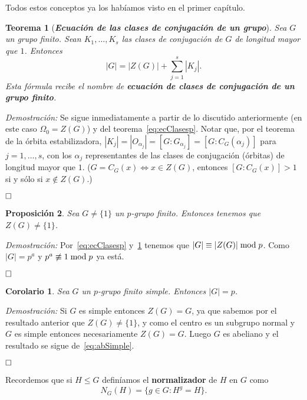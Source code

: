 \documentclass[12pt]{article}
\newtheorem{theorem}{Teorema}[section]
\newtheorem{proposition}[theorem]{Proposición}
\newtheorem{corolario}{Corolario}[theorem]
\begin{document}
Todos estos conceptos ya los habíamos visto en el primer capítulo.

\begin{theorem}[\textit{\textbf{Ecuación de las clases de conjugación de un grupo}}] \label{eq:ecClases}
Sea $G$ un grupo finito. Sean $K_{1}, \ldots, K_{s}$ las clases de conjugación de $G$ de longitud mayor que $1$. Entonces $$|G| = |Z(G)| + \sum_{j=1}^{s} |K_{j}|.$$ Esta fórmula recibe el nombre de \textbf{ecuación de clases de conjugación de un grupo finito}.
\end{theorem} 
\emph{Demostración: } Se sigue inmediatamente a partir de lo discutido anteriormente (en este caso $\Omega_0 = Z(G)$) y del teorema~\ref{eq:ecClasesp}. Notar que, por el teorema de la órbita estabilizadora, $|K_{j}| = |O_{\alpha_{j}}| = [G:G_{\alpha_{j}}] = [G:C_{G}(\alpha_{j})]$ para $j=1, \ldots, s$, con los $\alpha_{j}$ representantes de las clases de conjugación (órbitas) de longitud mayor que $1$.   ($G = C_{G}(x) \Longleftrightarrow x \in Z(G)$, entonces $\left[ G:C_{G}(x) \right] > 1$ si y sólo si $x \notin Z(G)$.)

$\hfill \square$

\begin{proposition}Sea $G \neq \lbrace 1 \rbrace$ un $p$-grupo finito. Entonces tenemos que $Z(G) \neq \lbrace 1 \rbrace$.
\end{proposition}
\emph{Demostración: }Por~\ref{eq:ecClasesp} y~\ref{eq:ecClases} tenemos que $|G| \equiv |Z(G)|\hspace{0.1cm}\text{mod}\hspace{0.1cm} p$. Como $|G| = p^a$ y $p^a \not\equiv 1 \hspace{0.1cm}\text{mod}\hspace{0.1cm}p$ ya está.

$\hfill \square$

\begin{corolario}Sea $G$ un $p$-grupo finito simple. Entonces $|G| = p$.
\end{corolario}
\emph{Demostración: }Si $G$ es simple entonces $Z(G) = G$, ya que sabemos por el resultado anterior que $Z(G) \neq \lbrace 1 \rbrace$, y como el centro es un subgrupo normal y $G$ es simple entonces necesariamente $Z(G) = G$. Luego $G$ es abeliano y el resultado se sigue de~\ref{eq:abSimple}.

$\hfill \square$

Recordemos que si $H \leq G$ definíamos el \textbf{normalizador} de $H$ en $G$ como $$N_G(H) = \lbrace g \in G : H^g = H \rbrace.$$
\end{document}
